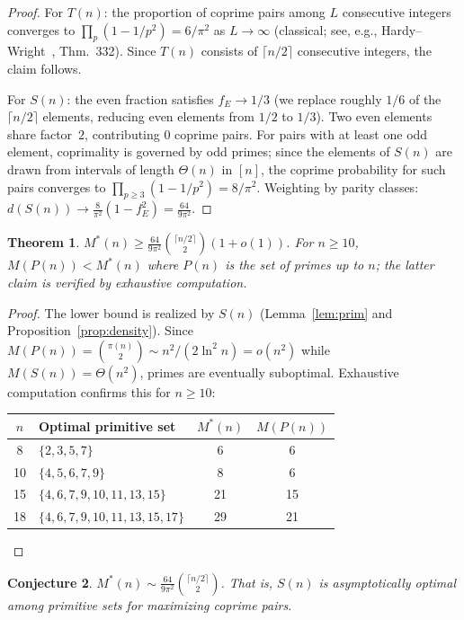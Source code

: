\documentclass[11pt]{article}
\theoremstyle{plain}
\newtheorem{theorem}{Theorem}[section]
\newtheorem{conjecture}[theorem]{Conjecture}
\theoremstyle{definition}
\begin{document}
\begin{proof}
For $T(n)$: the proportion of coprime pairs among $L$ consecutive
integers converges to $\prod_p(1-1/p^2)=6/\pi^2$ as $L\to\infty$
(classical; see, e.g., Hardy--Wright~\cite{hardywright}, Thm.~332). Since $T(n)$ consists
of $\lceil n/2\rceil$ consecutive integers, the claim follows.

For $S(n)$: the even fraction satisfies $f_E\to 1/3$ (we replace
roughly $1/6$ of the $\lceil n/2\rceil$ elements, reducing even
elements from $1/2$ to $1/3$). Two even elements share factor~$2$,
contributing $0$ coprime pairs. For pairs with at least one odd
element, coprimality is governed by odd primes; since the elements
of $S(n)$ are drawn from intervals of length $\Theta(n)$ in $[n]$,
the coprime probability for such pairs converges to
$\prod_{p\ge 3}(1-1/p^2)=8/\pi^2$. Weighting by parity classes:
$d(S(n))\to\frac{8}{\pi^2}(1-f_E^2)=\frac{64}{9\pi^2}$.
\end{proof}

\begin{theorem}\label{thm:main-prim}
$M^*(n)\ge\frac{64}{9\pi^2}\binom{\lceil n/2\rceil}{2}(1+o(1))$.
For $n\ge 10$, $M(P(n))<M^*(n)$ where $P(n)$ is the set of primes
up to $n$; the latter claim is verified by exhaustive computation.
\end{theorem}

\begin{proof}
The lower bound is realized by $S(n)$
(Lemma~\ref{lem:prim} and Proposition~\ref{prop:density}).
Since $M(P(n))=\binom{\pi(n)}{2}\sim n^2/(2\ln^2 n)=o(n^2)$ while
$M(S(n))=\Theta(n^2)$, primes are eventually suboptimal.
Exhaustive computation confirms this for $n\ge 10$:

\begin{center}
\begin{tabular}{@{}clcc@{}}
\toprule
$n$ & Optimal primitive set & $M^*(n)$ & $M(P(n))$ \\
\midrule
8   & $\{2,3,5,7\}$                    & 6  & 6 \\
10  & $\{4,5,6,7,9\}$                  & 8  & 6 \\
15  & $\{4,6,7,9,10,11,13,15\}$        & 21 & 15 \\
18  & $\{4,6,7,9,10,11,13,15,17\}$     & 29 & 21 \\
\bottomrule
\end{tabular}
\end{center}
\end{proof}

\begin{conjecture}\label{conj:prim-asymptotic}
$M^*(n)\sim\frac{64}{9\pi^2}\binom{\lceil n/2\rceil}{2}$.
That is, $S(n)$ is asymptotically optimal among primitive sets
for maximizing coprime pairs.
\end{conjecture}
\end{document}
